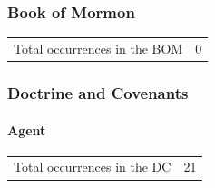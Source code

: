 	\subsubsection{Book of Mormon} %
		\label{AGENCY-BOM}
	
		\begin{tabular}{ll}
			Total occurrences in the BOM & 0
		\end{tabular}
		
		
	\subsubsection{Doctrine and Covenants} %
		\label{AGENCY-DC}
		
		\paragraph{Agent}
	
			\begin{tabular}{ll}
				Total occurrences in the DC & 21
			\end{tabular}
			
